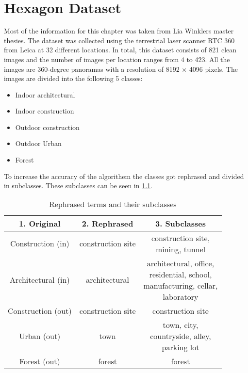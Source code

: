 \chapter{Hexagon Dataset
    \label{chapter:dataset}}
Most of the information for this chapter was taken from Lia Winklers master thesies.
The dataset was collected using the terrestrial laser scanner RTC 360 from Leica at 32 different locations.
In total, this dataset consists of 821 clean images and the number of images per location ranges from 4 to 423.
All the images are 360-degree panoramas with a
resolution of 8192 \(\times\) 4096 pixels.
The images are divided into the following 5 classes:

\begin{itemize}
    \item Indoor architectural
    \item Indoor construction
    \item Outdoor construction
    \item Outdoor Urban
    \item Forest
\end{itemize}

\noindent
To increase the accuracy of the algorithem the classes got rephrased and divided in subclasses.
These subclasses can be seen in \cref{tab:dataset:subclasses}.
\begin{table}[!ht]
    \centering
    \begin{tabular}{ccc}
    \toprule
    \textbf{1. Original}& \textbf{2. Rephrased}& \textbf{3. Subclasses}\\ \midrule
    Construction (in) & construction site & \makecell{construction site,\\ mining, tunnel}\\ \hline
    Architectural (in)& architectural& \makecell{architectural, office,\\ residential, school,\\ manufacturing, cellar,\\ laboratory} \\ \hline
    Construction (out)& construction site & construction site \\ \hline
    Urban (out)& town & \makecell{town, city,\\countryside, alley,\\ parking lot} \\ \hline
    Forest (out)& forest& forest \\
    \bottomrule
    \end{tabular}
    \caption{Rephrased terms and their subclasses
        \label{tab:dataset:subclasses}}
\end{table}

